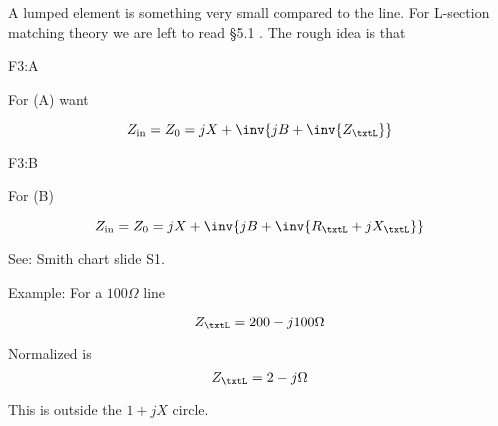 A lumped element is something very small compared to the line.  For L-section matching theory we are left to read \S 5.1 \citep{pozar2009microwave}.  The rough idea is that

F3:A

For (A) want

\begin{equation}\label{eqn:uwavesDeck6LCmatchingCore:180}
Z_{\textrm{in}} = Z_0 = j X + \inv{ j B + \inv{Z_\txtL} }
\end{equation}

F3:B

For (B)

\begin{equation}\label{eqn:uwavesDeck6LCmatchingCore:200}
Z_{\textrm{in}} = Z_0 = j X + \inv{ j B + \inv{R_\txtL + j X_\txtL} }
\end{equation}

See: Smith chart slide S1.

Example: For a \( 100 \Omega \) line

\begin{equation}\label{eqn:uwavesDeck6LCmatchingCore:220}
Z_\txtL = 200 -j 100 \Omega
\end{equation}

Normalized is
\begin{equation}\label{eqn:uwavesDeck6LCmatchingCore:240}
Z_\txtL = 2 -j \Omega
\end{equation}

This is outside the \( 1 + j X \) circle.
